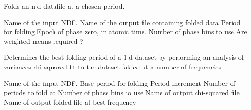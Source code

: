 
\begin{manroutinedescription}

Folds an n-d datafile at a chosen period.

\begin{manparametertable}
   Name of the input NDF.
   Name of the output file containing folded data
   Period for folding
   Epoch of phase zero, in atomic time.
   Number of phase bins to use
   Are weighted means required ?
\end{manparametertable}

\end{manroutinedescription}


\begin{manroutinedescription}

Determines the best folding period of a 1-d dataset by performing
an analysis of variances chi-squared fit to the dataset folded at a 
number of frequencies.

\begin{manparametertable}
   Name of the input NDF.
   Base period for folding
   Period increment
   Number of periods to fold at
   Number of phase bins to use
   Name of output chi-squared file
   Name of output folded file at best frequency
\end{manparametertable}

\end{manroutinedescription}

